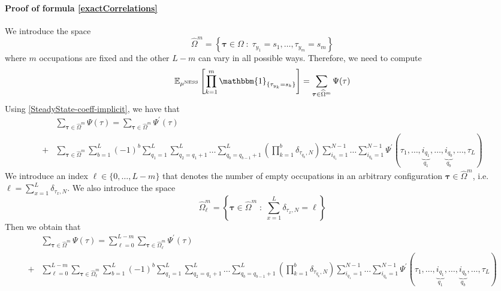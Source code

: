 \documentclass[10pt]{article}
\numberwithin{equation}{section}
\numberwithin{equation}{subsection}
\begin{document}
\paragraph{Proof of formula \eqref{exactCorrelations}}
{\color{blue}
We introduce the space 
\begin{equation}
	\widehat{\Omega}^{m}=\left\{\bm{\tau}\in \Omega\;:\; \tau_{y_{1}}=s_{1},\ldots,\tau_{y_{m}}=s_{m}\right\}
\end{equation}
where $m$ occupations are fixed and the other $L-m$ can vary in all possible ways. Therefore, we need to compute 
\begin{equation}
\mathbb{E}_{\mu^{\text{NESS}}}\left[\prod_{k=1}^{m}\mathbbm{1}_{\{\tau_{y_{k}}=s_{k}\}}\right]=\sum_{\bm{\tau}\in \widehat{\Omega}^{m}}\Psi(\tau)
\end{equation}
Using \eqref{SteadyState-coeff-implicit}, we have that 
\begin{align}
&\sum_{\bm{\tau}\in \widehat{\Omega}^{m}}\Psi(\tau)= \sum_{\bm{\tau}\in \widehat{\Omega}^{m}}\Psi^{'}(\tau)\nonumber
\\+&
\sum_{\bm{\tau}\in \widehat{\Omega}^{m}}\sum_{b=1}^{L}(-1)^{b}\sum_{q_{1}=1}^{L}\sum_{q_{2}=q_{1}+1}^{L}\ldots\sum_{q_{b}=q_{b-1}+1}^{L}\left(\prod_{k=1}^{b}\delta_{\tau_{q_{k}},N}\right)\sum_{i_{q_{1}}=1}^{N-1}\ldots\sum_{i_{q_{b}}=1}^{N-1}\Psi^{'}(\tau_{1},\ldots,\underbrace{i_{q_{1}}}_{q_{1}},\ldots,\underbrace{i_{q_{b}}}_{q_{b}},\ldots,\tau_{L})
\end{align}
We introduce an index $\ell\in \{0,\ldots, L-m\}$ that denotes the number of empty occupations in an arbitrary configuration $\bm{\tau}\in \widehat{\Omega}^{m}$, i.e. $\ell=\sum_{x=1}^{L}\delta_{\tau_{x},N}$. We also introduce the space 
\begin{equation}
\widehat{\Omega}^{m}_{\ell}=\left\{\bm{\tau}\in \widehat{\Omega}^{m}\;:\;\sum_{x=1}^{L}\delta_{\tau_{x},N}=\ell\right\}
\end{equation}
Then we obtain that 
\begin{align}
&\sum_{\bm{\tau}\in \widehat{\Omega}^{m}}\Psi(\tau)= \sum_{\ell=0}^{L-m}\sum_{\bm{\tau}\in \widehat{\Omega}^{m}_{\ell}}\Psi^{'}(\tau)\nonumber
\\+&
\sum_{\ell=0}^{L-m}\sum_{\bm{\tau}\in \widehat{\Omega}^{m}_{\ell}}\sum_{b=1}^{L}(-1)^{b}\sum_{q_{1}=1}^{L}\sum_{q_{2}=q_{1}+1}^{L}\ldots\sum_{q_{b}=q_{b-1}+1}^{L}\left(\prod_{k=1}^{b}\delta_{\tau_{q_{k}},N}\right)\sum_{i_{q_{1}}=1}^{N-1}\ldots\sum_{i_{q_{b}}=1}^{N-1}\Psi^{'}(\tau_{1},\ldots,\underbrace{i_{q_{1}}}_{q_{1}},\ldots,\underbrace{i_{q_{b}}}_{q_{b}},\ldots,\tau_{L})

\end{align}}
\end{document}
